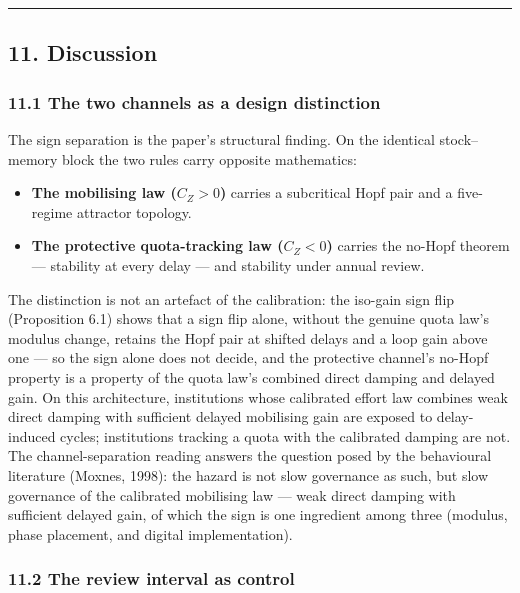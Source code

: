 \documentclass[11pt]{article}
\providecommand{\tightlist}{\setlength{\itemsep}{0pt}\setlength{\parskip}{0pt}}
\begin{document}
\begin{center}\rule{0.5\linewidth}{0.5pt}\end{center}

\subsection{11. Discussion}\label{discussion}

\subsubsection{11.1 The two channels as a design
distinction}\label{the-two-channels-as-a-design-distinction}

The sign separation is the paper's structural finding. On the identical
stock--memory block the two rules carry opposite mathematics:

\begin{itemize}
\tightlist
\item
  \textbf{The mobilising law (\(C_Z > 0\))} carries a subcritical Hopf
  pair and a five-regime attractor topology.
\item
  \textbf{The protective quota-tracking law (\(C_Z < 0\))} carries the
  no-Hopf theorem --- stability at every delay --- and stability under
  annual review.
\end{itemize}

The distinction is not an artefact of the calibration: the iso-gain sign
flip (Proposition 6.1) shows that a sign flip alone, without the genuine
quota law's modulus change, retains the Hopf pair at shifted delays and
a loop gain above one --- so the sign alone does not decide, and the
protective channel's no-Hopf property is a property of the quota law's
combined direct damping and delayed gain. On this architecture,
institutions whose calibrated effort law combines weak direct damping
with sufficient delayed mobilising gain are exposed to delay-induced
cycles; institutions tracking a quota with the calibrated damping are
not. The channel-separation reading answers the question posed by the
behavioural literature (Moxnes, 1998): the hazard is not slow governance
as such, but slow governance of the calibrated mobilising law --- weak
direct damping with sufficient delayed gain, of which the sign is one
ingredient among three (modulus, phase placement, and digital
implementation).

\subsubsection{11.2 The review interval as
control}\label{the-review-interval-as-control-1}
\end{document}
